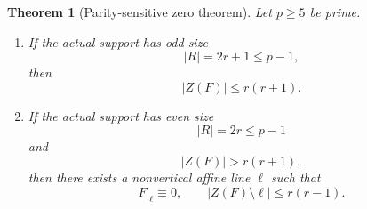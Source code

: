 \documentclass[11pt]{article}
\newtheorem{theorem}{Theorem}[section]
\begin{document}
\begin{theorem}[Parity-sensitive zero theorem]
\label{thm:parity-sensitive-zero}
Let \(p\ge5\) be prime.

\begin{enumerate}
\item If the actual support has odd size
\[
 |R|=2r+1\le p-1,
\]
then
\begin{equation}
 \boxed{|Z(F)|\le r(r+1).}
 \label{eq:odd-uniform-zero}
\end{equation}

\item If the actual support has even size
\[
 |R|=2r\le p-1
\]
and
\begin{equation}
 |Z(F)|>r(r+1),
 \label{eq:even-large-threshold}
\end{equation}
then there exists a nonvertical affine line \(\ell\) such that
\begin{equation}
 F|_\ell\equiv0,
 \qquad
 \boxed{|Z(F)\setminus\ell|\le r(r-1).}
 \label{eq:even-line-structure}
\end{equation}
\end{enumerate}
\end{theorem}
\end{document}
